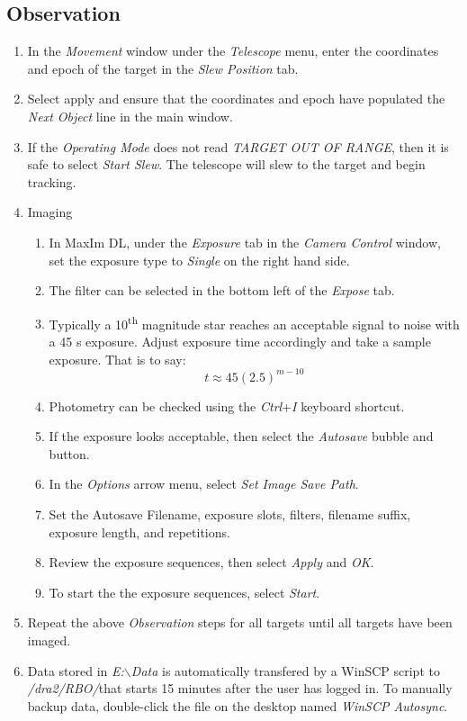 \documentclass[letterpaper,12pt]{article}
\begin{document}
	\subsection{Observation}
	\begin{enumerate}
	\item In the \textit{Movement} window under the \textit{Telescope} menu, enter the coordinates and epoch of the target in the \textit{Slew Position} tab.
	\item Select apply and ensure that the coordinates and epoch have populated the \textit{Next Object} line in the main window.
	\item If the \textit{Operating Mode} does not read \textit{TARGET OUT OF RANGE}, then it is safe to select \textit{Start Slew}. The telescope will slew to the target and begin tracking.
	\item Imaging
	\begin{enumerate}
		\item In MaxIm DL, under the \textit{Exposure} tab in the \textit{Camera Control} window, set the exposure type to \textit{Single} on the right hand side.
		\item The filter can be selected in the bottom left of the \textit{Expose} tab.
		\item Typically a 10\textsuperscript{th} magnitude star reaches an acceptable signal to noise with a 45 s exposure. Adjust exposure time accordingly and take a sample exposure. That is to say:
		\[
			t \approx 45\left (2.5\right )^{m-10}
		\]
		\item Photometry can be checked using the \textit{Ctrl}+\textit{I} keyboard shortcut.
		\item If the exposure looks acceptable, then select the \textit{Autosave} bubble and button.
		\item In the \textit{Options} arrow menu, select \textit{Set Image Save Path}.
		\item Set the Autosave Filename, exposure slots, filters, filename suffix, exposure length, and repetitions.
		\item Review the exposure sequences, then select \textit{Apply} and \textit{OK}.
		\item To start the the exposure sequences, select \textit{Start}.
	\end{enumerate}
	\item Repeat the above \textit{Observation} steps for all targets until all targets have been imaged.
	\item Data stored in \textit{E:$\backslash$Data} is automatically transfered by a WinSCP script to \textit{/dra2/RBO/}that starts 15 minutes after the user has logged in. To manually backup data, double-click the file on the desktop named \textit{WinSCP Autosync}.
	\end{enumerate}
\end{document}
